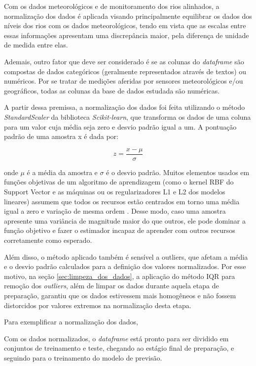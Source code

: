 Com os dados meteorológicos e de monitoramento dos rios alinhados, a normalização dos dados é aplicada visando principalmente equilibrar os dados dos níveis dos rios com os dados meteorológicos, tendo em vista que as escalas entre essas informações apresentam uma discrepância maior, pela diferença de unidade de medida entre elas.

Ademais, outro fator que deve ser considerado é se as colunas do \textit{dataframe} são compostas de dados categóricos (geralmente representados através de textos) ou numéricos. Por se tratar de medições aferidas por sensores meteorológicos e/ou geográficos, todas as colunas da base de dados estudada são numéricas.

A partir dessa premissa, a normalização dos dados foi feita utilizando o método \textit{StandardScaler} da biblioteca \textit{Scikit-learn}, que transforma os dados de uma coluna para um valor cuja média seja zero e desvio padrão igual a um. A pontuação padrão de uma amostra x é dada por:

\begin{equation}
z = \frac{x - \mu}{\sigma}
\end{equation}

onde \( \mu \) é a média da amostra e \( \sigma \) é o desvio padrão. Muitos elementos usados em funções objetivas de um algoritmo de aprendizagem (como o kernel RBF do Support Vector e as máquinas ou os regularizadores L1 e L2 dos modelos lineares) assumem que todos os recursos estão centrados em torno uma média igual a zero e variação de mesma ordem \cite{scikit_learn_standardscaler}. Desse modo, caso uma amostra apresente uma variância de magnitude maior do que outros, ele pode dominar a função objetivo e fazer o estimador incapaz de aprender com outros recursos corretamente como esperado.

Além disso, o método aplicado também é sensível a outliers, que afetam a média e o desvio padrão calculados para a definição dos valores normalizados. Por esse motivo, na seção \ref{sec:limpeza_dos_dados}, a aplicação do método IQR para remoção dos \textit{outliers}, além de limpar os dados durante aquela etapa de preparação, garantiu que os dados estivessem mais homogêneos e não fossem distorcidos por valores extremos na normalização desta etapa.

Para exemplificar a normalização dos dados, 

Com os dados normalizados, o \textit{dataframe} está pronto para ser dividido em conjuntos de treinamento e teste, chegando ao estágio final de preparação, e seguindo para o treinamento do modelo de previsão. 

